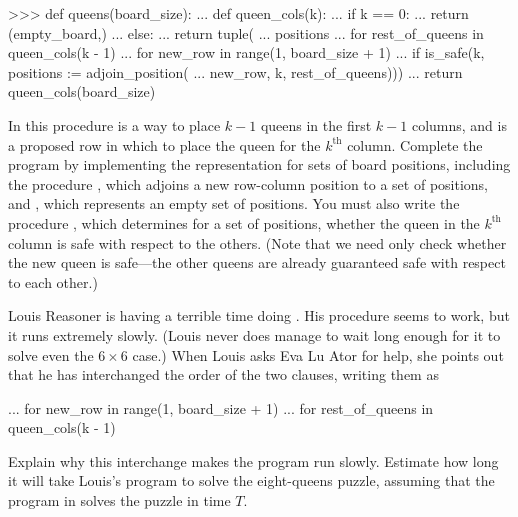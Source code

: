 \begin{exerciseGroup}
\begin{codeBlock}

>>> def queens(board_size):
...     def queen_cols(k):
...         if k == 0:
...             return (empty_board,)
...         else:
...             return tuple(
...                 positions
...                 for rest_of_queens in queen_cols(k - 1)
...                 for new_row in range(1, board_size + 1)
...                 if is_safe(k, positions := adjoin_position(
...                     new_row, k, rest_of_queens)))
...     return queen_cols(board_size)
\end{codeBlock}

In this procedure  is a way to place \( k - 1 \) queens
in the first \( k - 1 \) columns, and  is a proposed row in
which to place the queen for the \( k^{\mathrm{th}} \) column.  Complete the
program by implementing the representation for sets of board positions,
including the procedure , which adjoins a new row-column
position to a set of positions, and , which represents an
empty set of positions. You must also write the procedure ,
which determines for a set of positions, whether the queen in the \(
k^{\mathrm{th}} \) column is safe with respect to the others.  (Note that we
need only check whether the new queen is safe---the other queens are already
guaranteed safe with respect to each other.)

\label{Exercise 2.43}
 Louis Reasoner is having a
terrible time doing .  His  procedure seems to
work, but it runs extremely slowly.  (Louis never does manage to wait long
enough for it to solve even the \( 6\times6 \) case.)  When Louis asks Eva Lu
Ator for help, she points out that he has interchanged the order of the two
 clauses, writing them as

\begin{codeBlock}
...                 for new_row in range(1, board_size + 1)
...                 for rest_of_queens in queen_cols(k - 1)
\end{codeBlock}

Explain why this interchange makes the program run slowly.  Estimate how long
it will take Louis's program to solve the eight-queens puzzle, assuming that
the program in  solves the puzzle in time \( T \).
\end{exerciseGroup}

